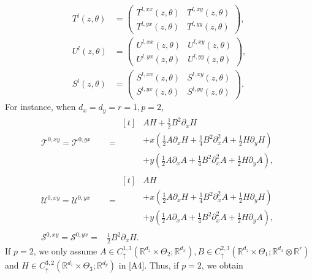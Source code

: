 \documentclass[a4paper,11pt]{jsarticle}
\begin{document}
\begin{align}
T^l(z,\theta) &= \begin{pmatrix}
    T^{l,xx}(z,\theta) & T^{l,xy}(z,\theta) \\ T^{l,yx}(z,\theta) & T^{l,yy}(z,\theta)
\end{pmatrix} ,   \\U^l(z,\theta) &= \begin{pmatrix}
U^{l,xx}(z,\theta) & U^{l,xy}(z,\theta) \\ U^{l,yx}(z,\theta) & U^{l,yy}(z,\theta)
\end{pmatrix}, \\
S^l(z,\theta) &= \begin{pmatrix}
S^{l,xx}(z,\theta) & S^{l,xy}(z,\theta) \\ S^{l,yx}(z,\theta) & S^{l,yy}(z,\theta)
\end{pmatrix}.
\end{align}
For instance, when $d_x = d_y = r = 1, p =2$,
\begin{align}
      \mathscr{T}^{0,xy} = \mathscr{T}^{0,yx} &  = \begin{aligned}[t]
&  AH + \frac{1}{2} B^2 \partial_x H \\&+ x ( \frac{1}{2}A  \partial_x H  + \frac{1}{4} B^2 \partial_x^2 A + \frac{1}{2} H \partial_y H) \\ & + y (  \frac{1}{2}A \partial_x A + \frac{1}{4}B^2 \partial_x^2 A  +  \frac{1}{2}H \partial_y A), 
\end{aligned}\label{are}
\\  \mathscr{U}^{0,xy} = \mathscr{U}^{0,yx} &= \begin{aligned}[t] & AH\\&+ x ( \frac{1}{2}A  \partial_x H  + \frac{1}{4} B^2 \partial_x^2 A + \frac{1}{2} H \partial_y H) \\ & + y (  \frac{1}{2}A \partial_x A + \frac{1}{4}B^2 \partial_x^2 A  +  \frac{1}{2}H \partial_y A),
\end{aligned} \label{sore}\\ \mathscr{S}^{0,xy}  = \mathscr{S}^{0,yx} = & \frac{1}{2} B^2 \partial_x H. \label{kore}
\end{align}
If $ p =2$, we only assume $A \in C_\uparrow^{1,3 }(\mathbb{R}^{d_z} \times \Theta_2 ; \mathbb{R}^{d_x}),B \in C_\uparrow^{2,3}( \mathbb{R}^{d_z} \times \Theta_1; \mathbb{R}^{d_x} \otimes \mathbb{R}^r)$ and $H \in C_\uparrow^{3,2}(\mathbb{R}^{d_z} \times \Theta_3; \mathbb{R}^{d_y})$ in [A4]. Thus, if $p =2$, we obtain
\end{document}
